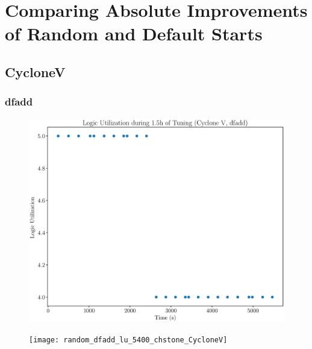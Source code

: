 \documentclass[12pt, a4paper]{article}
\begin{document}
\section{Comparing Absolute Improvements of Random and Default Starts}

\newpage

\subsection{CycloneV}

\subsubsection{dfadd}

\begin{figure}[htpb]
    \centering
    \noindent
    \begin{minipage}{.48\textwidth}
        \centering
        \includegraphics[scale=.25]{dfadd_lu_5400_chstone_CycloneV}
    \end{minipage}%
    \hfill
    \begin{minipage}{.48\textwidth}
        \centering
        \texttt{[image: random\_dfadd\_lu\_5400\_chstone\_CycloneV]}
    \end{minipage}%


\end{figure}
\end{document}

